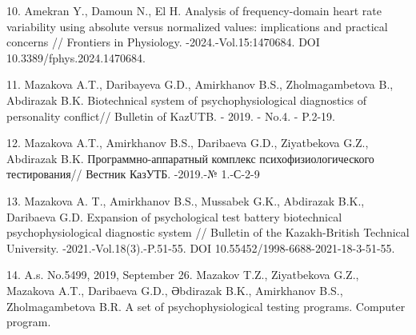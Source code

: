 \begin{refs}
10. Amekran Y., Damoun N., El H. Analysis of frequency-domain heart rate
variability using absolute versus normalized values: implications and
practical concerns // Frontiers in Physiology. -2024.-Vol.15:1470684.
DOI 10.3389/fphys.2024.1470684.

11. Mazakova A.T., Daribayeva G.D., Amirkhanov B.S., Zholmagambetova B.,
Abdirazak B.K. Biotechnical system of psychophysiological diagnostics of
personality conflict// Bulletin of KazUTB. - 2019. - No.4. - P.2-19.

12. Mazakova A.T., Amirkhanov B.S., Daribaeva G.D., Ziyatbekova G.Z.,
Abdirazak B.K. Программно-аппаратный комплекс психофизиологического
тестирования// Вестник КазУТБ. -2019.-№ 1.-С-2-9

13. Mazakova A. T., Amirkhanov B.S., Mussabek G.K.,
Abdirazak B.K., Daribaeva G.D. Expansion of psychological test battery
biotechnical psychophysiological diagnostic system // Bulletin of the
Kazakh-British Technical University. -2021.-Vol.18(3).-P.51-55. DOI
10.55452/1998-6688-2021-18-3-51-55.

14. A.s. No.5499, 2019, September 26. Mazakov T.Z., Ziyatbekova G.Z.,
Mazakova A.T., Daribaeva G.D., Əbdirazak B.K., Amirkhanov B.S.,
Zholmagambetova B.R. A set of psychophysiological testing programs.
Computer program.
\end{refs}

